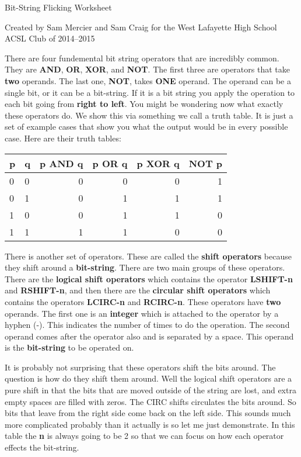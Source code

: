\documentclass[12pt,letterpaper]{article}
\begin{document}
\begin{center}
  Bit-String Flicking Worksheet

  Created by Sam Mercier and Sam Craig for the West Lafayette High School ACSL Club of 2014--2015
\end{center}

There are four fundemental bit string operators that are incredibly common. They are \textbf{AND}, \textbf{OR}, \textbf{XOR}, and \textbf{NOT}. The first three are operators that take \textbf{two} operands. The last one, \textbf{NOT}, takes \textbf{ONE} operand. The operand can be a single bit, or it can be a bit-string. If it is a bit string you apply the operation to each bit going from \textbf{right to left}. You might be wondering now what exactly these operators do. We show this via something we call a truth table. It is just a set of example cases that show you what the output would be in every possible case. Here are their truth tables:

\begin{center}
  \begin{tabular}{| l | l || r | r | r | r |}
    \hline
    p & q & p \textbf{AND} q & p \textbf{OR} q & p \textbf{XOR} q & \textbf{NOT} p \\
    \hline \hline
    0 & 0 & 0 & 0 & 0 & 1 \\
    0 & 1 & 0 & 1 & 1 & 1 \\
    1 & 0 & 0 & 1 & 1 & 0 \\
    1 & 1 & 1 & 1 & 0 & 0 \\
    \hline
  \end{tabular}
\end{center}

There is another set of operators.
These are called the \textbf{shift operators} because they shift around a \textbf{bit-string}.
There are two main groups of these operators.
There are the \textbf{logical shift operators} which contains the operator \textbf{LSHIFT-n} and \textbf{RSHIFT-n}, and then there are the \textbf{circular shift operators} which contains the operators \textbf{LCIRC-n} and \textbf{RCIRC-n}.
These operators have \textbf{two} operands.
The first one is an \textbf{integer} which is attached to the operator by a hyphen (-).
This indicates the number of times to do the operation.
The second operand comes after the operator also and is separated by a space.
This operand is the \textbf{bit-string} to be operated on.

It is probably not surprising that these operators shift the bits around.
The question is how do they shift them around.
Well the logical shift operators are a pure shift in that the bits that are moved outside of the string are lost, and extra empty spaces are filled with zeros.
The CIRC shifts circulates the bits around.
So bits that leave from the right side come back on the left side.
This sounds much more complicated probably than it actually is so let me just demonstrate.
In this table the \textbf{n} is always going to be 2 so that we can focus on how each operator effects the bit-string.
\end{document}
